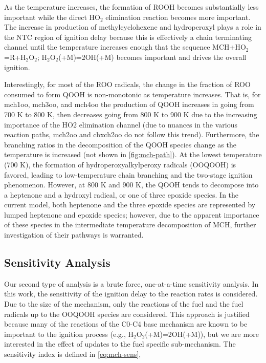 \documentclass[12pt, letterpaper]{article}
\begin{document}
As the temperature increases, the formation of ROOH becomes substantially less 
important while the direct HO$_2$ elimination reaction becomes more important. 
The increase in production of methylcyclohexene and hydroperoxyl plays a role 
in the NTC region of ignition delay because this is effectively a chain 
terminating channel until the temperature increases enough that the sequence 
MCH+HO$_2$=R+H$_2$O$_2$; H$_2$O$_2$(+M)=2OH(+M) becomes important and drives 
the overall ignition.

Interestingly, for most of the ROO radicals, the change in the fraction of ROO 
consumed to form QOOH is non-monotonic as temperature increases. That is, for 
mch1oo, mch3oo, and mch4oo the production of QOOH increases in going from 700 K 
to 800 K, then decreases going from 800 K to 900 K due to the increasing 
importance of the HO2 elimination channel (due to nuances in the various 
reaction paths, mch2oo and chxch2oo do not follow this trend). Furthermore, 
the branching ratios in the decomposition of the QOOH species change as the 
temperature is increased (not shown in \autoref{fig:mch-path}). At the lowest 
temperature (700 K), the formation of hydroperoxyalkylperoxy radicals (OOQOOH) 
is favored, leading to low-temperature chain branching and the two-stage 
ignition phenomenon. However, at 800 K and 900 K, the QOOH tends to decompose 
into a heptenone and a hydroxyl radical, or one of three epoxide species. In 
the current model, both heptenone and the three epoxide species are represented 
by lumped heptenone and epoxide species; however, due to the apparent 
importance of these species in the intermediate temperature decomposition of 
MCH, further investigation of their pathways is warranted.

\subsection{Sensitivity Analysis}
\label{sec:sensitivity-analysis}

Our second type of analysis is a brute force, one-at-a-time sensitivity 
analysis. In this work, the sensitivity of the ignition delay to the reaction 
rates is considered. Due to the size of the mechanism, only the reactions of 
the fuel and the fuel radicals up to the OOQOOH species are considered. This 
approach is justified because many of the reactions of the C0-C4 base 
mechanism are known to be important to the ignition process (e.g., 
H$_2$O$_2$(+M)=2OH(+M)), but we are more interested in the effect of updates to 
the fuel specific sub-mechanism. The sensitivity index is defined in 
\autoref{eq:mch-sens},
\end{document}

